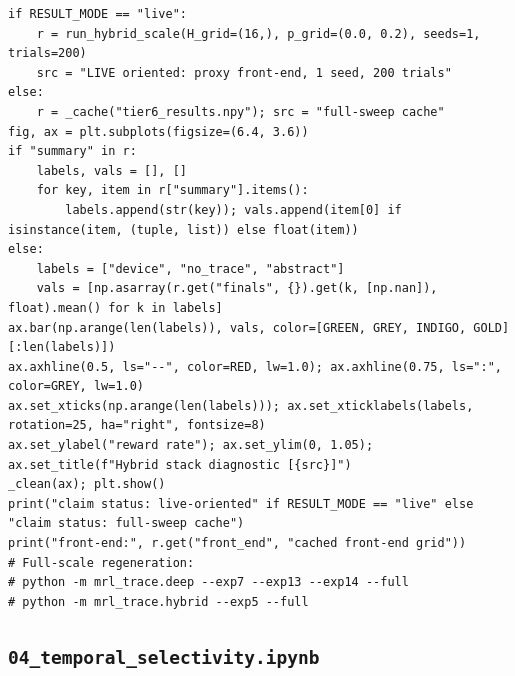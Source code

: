 \begin{lstlisting}[caption={03\_deep\_local\_learning.ipynb code cell 5},label={lst:mrl-nb-03-deep-local-learning-5}]
if RESULT_MODE == "live":
    r = run_hybrid_scale(H_grid=(16,), p_grid=(0.0, 0.2), seeds=1, trials=200)
    src = "LIVE oriented: proxy front-end, 1 seed, 200 trials"
else:
    r = _cache("tier6_results.npy"); src = "full-sweep cache"
fig, ax = plt.subplots(figsize=(6.4, 3.6))
if "summary" in r:
    labels, vals = [], []
    for key, item in r["summary"].items():
        labels.append(str(key)); vals.append(item[0] if isinstance(item, (tuple, list)) else float(item))
else:
    labels = ["device", "no_trace", "abstract"]
    vals = [np.asarray(r.get("finals", {}).get(k, [np.nan]), float).mean() for k in labels]
ax.bar(np.arange(len(labels)), vals, color=[GREEN, GREY, INDIGO, GOLD][:len(labels)])
ax.axhline(0.5, ls="--", color=RED, lw=1.0); ax.axhline(0.75, ls=":", color=GREY, lw=1.0)
ax.set_xticks(np.arange(len(labels))); ax.set_xticklabels(labels, rotation=25, ha="right", fontsize=8)
ax.set_ylabel("reward rate"); ax.set_ylim(0, 1.05); ax.set_title(f"Hybrid stack diagnostic [{src}]")
_clean(ax); plt.show()
print("claim status: live-oriented" if RESULT_MODE == "live" else "claim status: full-sweep cache")
print("front-end:", r.get("front_end", "cached front-end grid"))
# Full-scale regeneration:
# python -m mrl_trace.deep --exp7 --exp13 --exp14 --full
# python -m mrl_trace.hybrid --exp5 --full
\end{lstlisting}

\subsection{\texttt{04\_temporal\_selectivity.ipynb}}

